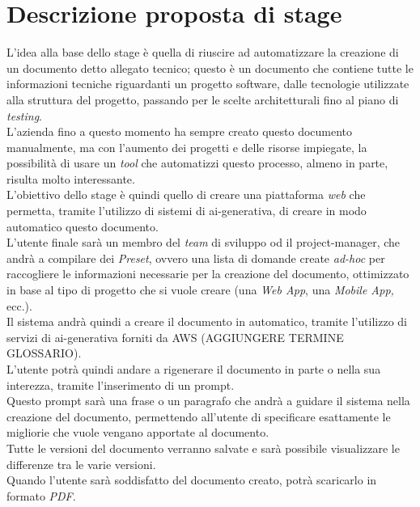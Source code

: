 \section{Descrizione proposta di stage}
\label{sez:descrizione-stage}

L'idea alla base dello stage è quella di riuscire ad automatizzare la creazione di un documento detto allegato tecnico; questo è un documento che contiene
tutte le informazioni tecniche riguardanti un progetto software, dalle tecnologie utilizzate alla struttura del progetto, passando per le scelte architetturali fino al piano di \textit{testing}.\\
L'azienda fino a questo momento ha sempre creato questo documento manualmente, ma con l'aumento dei progetti e delle risorse impiegate, la possibilità di usare un \textit{tool} che automatizzi questo processo,
almeno in parte, risulta molto interessante.\\

\noindent L'obiettivo dello stage è quindi quello di creare una piattaforma \textit{web} che permetta, tramite l'utilizzo di sistemi di \gls{ai-generativa}, di creare in modo automatico questo documento. \\
L'utente finale sarà un membro del \textit{team} di sviluppo od il \gls{project-manager}, che andrà a compilare dei \textit{Preset}, ovvero una lista di domande create \textit{ad-hoc} per raccogliere le informazioni necessarie per la creazione del documento,
ottimizzato in base al tipo di progetto che si vuole creare (una \textit{Web App}, una \textit {Mobile App,} ecc.).\\
Il sistema andrà quindi a creare il documento in automatico, tramite l'utilizzo di servizi di \gls{ai-generativa} forniti da AWS (AGGIUNGERE TERMINE GLOSSARIO). \\

\noindent L'utente potrà quindi andare a rigenerare il documento in parte o nella sua interezza, tramite l'inserimento di un \gls{prompt}.\\
Questo \gls{prompt} sarà una frase o un paragrafo che andrà a guidare il sistema nella creazione del documento, permettendo all'utente di specificare esattamente le migliorie che vuole vengano apportate al documento.\\
Tutte le versioni del documento verranno salvate e sarà possibile  visualizzare le differenze tra le varie versioni.\\
Quando l'utente sarà soddisfatto del documento creato, potrà scaricarlo in formato \textit{PDF}.\\

